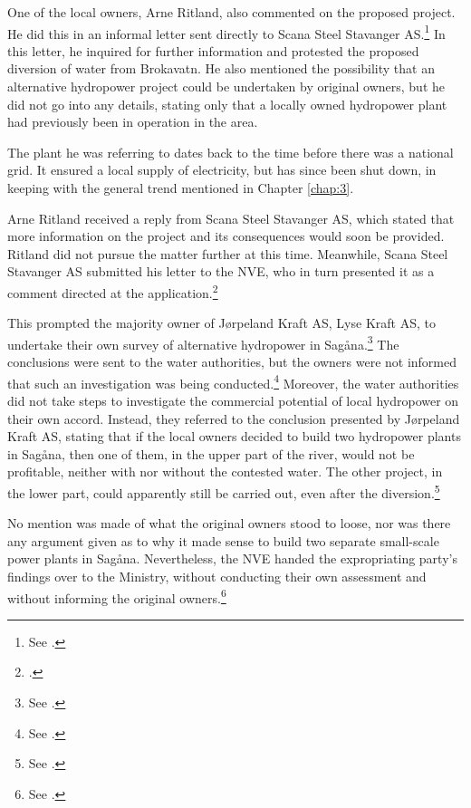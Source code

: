 One of the local owners, Arne Ritland, also commented on the proposed project. He did this in an informal letter sent directly to Scana Steel Stavanger AS.\footnote{See \cite[17]{jorpeland09}.} In this letter, he inquired for further information and protested the proposed diversion of water from Brokavatn. He also mentioned the possibility that an alternative hydropower project could be undertaken by original owners, but he did not go into any details, stating only that a locally owned hydropower plant had previously been in operation in the area. 

The plant he was referring to dates back to the time before there was a national grid. It ensured a local supply of electricity, but has since been shut down, in keeping with the general trend mentioned in Chapter \ref{chap:3}.

Arne Ritland received a reply from Scana Steel Stavanger AS, which stated that more information on the project and its consequences would soon be provided. Ritland did not pursue the matter further at this time. Meanwhile, Scana Steel Stavanger AS submitted his letter to the NVE, who in turn presented it as a comment directed at the application.\footnote{\cite[18]{jorpeland09}.}

This prompted the majority owner of Jørpeland Kraft AS, Lyse Kraft AS, to undertake their own survey of alternative hydropower in Sagåna.\footnote{See \cite[19]{jorpeland09}.} The conclusions were sent to the water authorities, but the owners were not informed that such an investigation was being conducted.\footnote{See \cite[23]{jorpeland09}.} Moreover, the water authorities did not take steps to investigate the commercial potential of local hydropower on their own accord. Instead, they referred to the conclusion presented by Jørpeland Kraft AS, stating that if the local owners decided to build two hydropower plants in Sagåna, then one of them, in the upper part of the river, would not be profitable, neither with nor without the contested water. The other project, in the lower part, could apparently still be carried out, even after the diversion.\footnote{See \cite[23]{jorpeland09}.}

No mention was made of what the original owners stood to loose, nor was there any argument given as to why it made sense to build two separate small-scale power plants in Sagåna. Nevertheless, the NVE handed the expropriating party's findings over to the Ministry, without conducting their own assessment and without informing the original owners.\footnote{See \cite[22-23]{jorpeland09}.}

